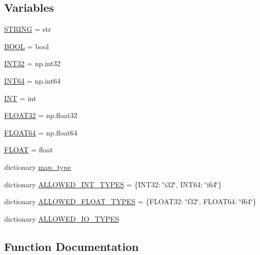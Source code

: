 \subsection*{Variables}
\begin{DoxyCompactItemize}
\item 
\hyperlink{namespacemui4py_1_1types_a2cf5b7a10d04fc1c64862a3a98d6a5ab}{S\+T\+R\+I\+NG} = str
\item 
\hyperlink{namespacemui4py_1_1types_a1188b1f9b896037f00fca845bc7ea630}{B\+O\+OL} = bool
\item 
\hyperlink{namespacemui4py_1_1types_a49a9ac30bad49e0d7b16d3a4d4d11b50}{I\+N\+T32} = np.\+int32
\item 
\hyperlink{namespacemui4py_1_1types_a0d041888e6be00c934dfe8e988e69bed}{I\+N\+T64} = np.\+int64
\item 
\hyperlink{namespacemui4py_1_1types_a83c7286300badd4d5e607d1fbdc30cd1}{I\+NT} = int
\item 
\hyperlink{namespacemui4py_1_1types_a5f8c1bf92aba42f46937a71c053c8a13}{F\+L\+O\+A\+T32} = np.\+float32
\item 
\hyperlink{namespacemui4py_1_1types_acc13da2e220befa943ab9238c890ebc0}{F\+L\+O\+A\+T64} = np.\+float64
\item 
\hyperlink{namespacemui4py_1_1types_a9c0dc4289955c85a1b9685282e890537}{F\+L\+O\+AT} = float
\item 
dictionary \hyperlink{namespacemui4py_1_1types_ab8ef776fe36ad2e5d79102804c2b21d8}{map\+\_\+type}
\item 
dictionary \hyperlink{namespacemui4py_1_1types_a946e6ae75d949fa129efcc35ea24fc5f}{A\+L\+L\+O\+W\+E\+D\+\_\+\+I\+N\+T\+\_\+\+T\+Y\+P\+ES} = \{I\+N\+T32\+: \char`\"{}i32\char`\"{}, I\+N\+T64\+: \char`\"{}i64\char`\"{}\}
\item 
dictionary \hyperlink{namespacemui4py_1_1types_a17509d19f970222de23e4fa81add66ab}{A\+L\+L\+O\+W\+E\+D\+\_\+\+F\+L\+O\+A\+T\+\_\+\+T\+Y\+P\+ES} = \{F\+L\+O\+A\+T32\+: \char`\"{}f32\char`\"{}, F\+L\+O\+A\+T64\+: \char`\"{}f64\char`\"{}\}
\item 
dictionary \hyperlink{namespacemui4py_1_1types_adc651c6e56ea773a96ae927aa9d68ff6}{A\+L\+L\+O\+W\+E\+D\+\_\+\+I\+O\+\_\+\+T\+Y\+P\+ES}
\end{DoxyCompactItemize}


\subsection{Function Documentation}
\mbox{\label{namespacemui4py_1_1types_a8159e2d4feddf7cb3c36b3b2f1fabede}} 
